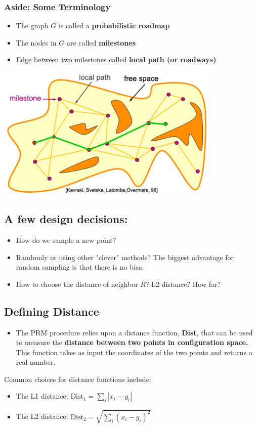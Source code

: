 \documentclass[10pt]{article}
\begin{document}
\subsubsection*{Aside: Some Terminology}
\begin{itemize}
	\item The graph $G$ is called a \textbf{probabilistic roadmap}
	\item The nodes in $G$ are called \textbf{milestones}
	\item Edge between two milestones called \textbf{local path (or roadways)}
\end{itemize}
\begin{center} 
    \includegraphics*[width=0.8\textwidth]{L1_8.png} 
\end{center}

\subsection*{A few design decisions:}
\begin{itemize}
	\item How do we sample a new point?
	\item Randomly or using other "clever" methods?  The biggest advantage for random sampling is that there is no bias.
	\item How to choose the distance of neighbor $R$?  L2 distance?  How far?
\end{itemize}

\subsection*{Defining Distance}
\begin{itemize}
	\item The PRM procedure relies upon a distance function, \textbf{Dist}, that can be used to measure the \textbf{distance between two points in configuration space.}  This function takes as input the coordinates of the two points and returns a real number.
\end{itemize}
Common choices for distance functions include:
\begin{itemize}
	\item The L1 distance: $\text{Dist}_1 = \sum_i |x_i - y_i|$
	\item The L2 distance: $\text{Dist}_2 = \sqrt{\sum_i (x_i - y_i)^2}$
\end{itemize}
\end{document}
